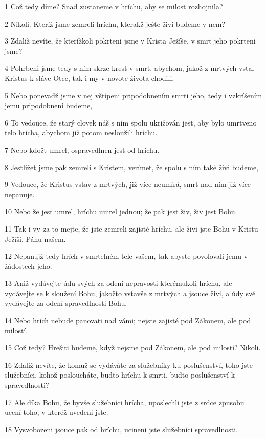 \par 1 Což tedy díme? Snad zustaneme v hríchu, aby se milost rozhojnila?
\par 2 Nikoli. Kteríž jsme zemreli hríchu, kterakž ješte živi budeme v nem?
\par 3 Zdaliž nevíte, že kterížkoli pokrteni jsme v Krista Ježíše, v smrt jeho pokrteni jsme?
\par 4 Pohrbeni jsme tedy s ním skrze krest v smrt, abychom, jakož z mrtvých vstal Kristus k sláve Otce, tak i my v novote života chodili.
\par 5 Nebo ponevadž jsme v nej vštípeni pripodobnením smrti jeho, tedy i vzkríšením jemu pripodobneni budeme,
\par 6 To vedouce, že starý clovek náš s ním spolu ukrižován jest, aby bylo umrtveno telo hrícha, abychom již potom nesloužili hríchu.
\par 7 Nebo kdožt umrel, ospravedlnen jest od hríchu.
\par 8 Jestližet jsme pak zemreli s Kristem, verímet, že spolu s ním také živi budeme,
\par 9 Vedouce, že Kristus vstav z mrtvých, již více neumírá, smrt nad ním již více nepanuje.
\par 10 Nebo že jest umrel, hríchu umrel jednou; že pak jest živ, živ jest Bohu.
\par 11 Tak i vy za to mejte, že jste zemreli zajisté hríchu, ale živi jste Bohu v Kristu Ježíši, Pánu našem.
\par 12 Nepanujž tedy hrích v smrtelném tele vašem, tak abyste povolovali jemu v žádostech jeho.
\par 13 Aniž vydávejte údu svých za odení nepravosti kterémukoli hríchu, ale vydávejte se k sloužení Bohu, jakožto vstavše z mrtvých a jsouce živi, a údy své vydávejte za odení spravedlnosti Bohu.
\par 14 Nebo hrích nebude panovati nad vámi; nejste zajisté pod Zákonem, ale pod milostí.
\par 15 Což tedy? Hrešiti budeme, když nejsme pod Zákonem, ale pod milostí? Nikoli.
\par 16 Zdaliž nevíte, že komuž se vydáváte za služebníky ku poslušenství, toho jste služebníci, kohož posloucháte, budto hríchu k smrti, budto poslušenství k spravedlnosti?
\par 17 Ale díka Bohu, že byvše služebníci hrícha, uposlechli jste z srdce zpusobu ucení toho, v kteréž uvedeni jste.
\par 18 Vysvobozeni jsouce pak od hríchu, ucineni jste služebníci spravedlnosti.
